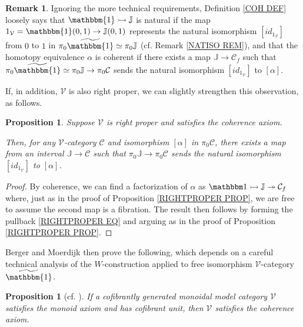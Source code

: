 \documentclass[a4paper,10pt
,draft
]{article}%
\numberwithin{equation}{section}
\numberwithin{figure}{section}
\newtheorem{proposition}[equation]{Proposition}%
\theoremstyle{definition} %
\newtheorem{remark}[equation]{Remark}%
\newcommand{\V}{\ensuremath{\mathcal V}}
\newcommand{\1}{\ensuremath{\mathbbm 1}}%
\begin{document}
\begin{remark}
Ignoring the more technical requirements,
Definition \ref{COH DEF} loosely says that  
$\mathbbm{1} \rightarrowtail \mathbb{J}$
is natural if the map $1_{\V} = \mathbbm{1}(0,1) \to \mathbb{J}(0,1)$
represents the natural isomorphism
$[id_{1_{\V}}]$ from $0$ to $1$ in $ \pi_0 \widetilde{\mathbbm{1}} \simeq \pi_0 \mathbb{J}$ (cf. Remark \ref{NATISO REM}),
%
and that the homotopy equivalence $\alpha$ is coherent
if there exists a map $\mathbb{J} \to \mathcal C_f$
such that
$\pi_0 \widetilde{\mathbbm{1}} \simeq
\pi_0 \mathbb{J} \to \pi_0 \mathcal C$
sends the natural isomorphism $[id_{1_{\V}}]$ to $[\alpha]$.

If, in addition, $\V$ is also right proper, we can slightly strengthen this observation, as follows.
\end{remark}



\begin{proposition}\label{ALTCOH PROP}
Suppose $\V$ is right proper and satisfies the coherence axiom.

Then, for any $\V$-category $\mathcal{C}$ and isomorphism  
$[\alpha]$ in $\pi_0 \mathcal{C}$,
there exists a map from an interval 
$\mathbb{J} \to \mathcal{C}$
such that 
$\pi_0 \mathbb{J} \to \pi_0\mathcal{C}$
sends the natural isomorphism $[id_{1_{\V}}]$ to $[\alpha]$.
\end{proposition}



\begin{proof}
By coherence, we can find a factorization of 
$\alpha$ as 
$\1 \rightarrowtail \mathbb J \twoheadrightarrow \mathcal C_f$
where, just as in the proof of
Proposition \ref{RIGHTPROPER PROP},
we are free to assume the second map is a fibration.
The result then follows by forming the pullback \eqref{RIGHTPROPER EQ} and arguing as in the proof of Proposition \ref{RIGHTPROPER PROP}.
\end{proof}





Berger and Moerdijk then prove the following,
which depends on a careful technical analysis of the $W$-construction applied to free isomorphism $\V$-category
$\widetilde{\mathbbm{1}}$.



 

\begin{proposition}[{cf. \cite[Prop. 2.24]{BM13}}]
\label{COHAX PROP}
If a cofibrantly generated monoidal model category $\V$
satisfies the monoid axiom and has cofibrant unit,
then $\V$ satisfies the coherence axiom.
\end{proposition}
\end{document}
